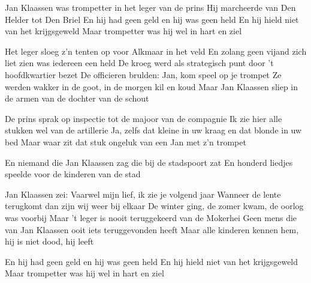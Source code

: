 \begin{chorus}
Jan Klaassen was trompetter in het leger van de prins
Hij marcheerde van Den Helder tot Den Briel
En hij had geen geld en hij was geen held
En hij hield niet van het krijgsgeweld
Maar trompetter was hij wel in hart en ziel
\end{chorus}

\begin{verse*}
Het leger sloeg z'n tenten op voor Alkmaar in het veld
En zolang geen vijand zich liet zien was iedereen een held
De kroeg werd als strategisch punt door 't hoofdkwartier bezet
De officieren brulden: Jan, kom speel op je trompet
Ze werden wakker in de goot, in de morgen kil en koud
Maar Jan Klaassen sliep in de armen van de dochter van de schout
\end{verse*}

\thechorus

\begin{verse*}
De prins sprak op inspectie tot de majoor van de compagnie
Ik zie hier alle stukken wel van de artillerie
Ja, zelfs dat kleine in uw kraag en dat blonde in uw bed
Maar waar zit dat stuk ongeluk van een Jan met z'n trompet
\end{verse*}

\begin{verse*}
En niemand die Jan Klaassen zag die bij de stadspoort zat
En honderd liedjes speelde voor de kinderen van de stad
\end{verse*}

\thechorus

\begin{verse*}
Jan Klaassen zei: Vaarwel mijn lief, ik zie je volgend jaar
Wanneer de lente terugkomt dan zijn wij weer bij elkaar
De winter ging, de zomer kwam, de oorlog was voorbij
Maar 't leger is nooit teruggekeerd van de Mokerhei
Geen mens die van Jan Klaassen ooit iets teruggevonden heeft
Maar alle kinderen kennen hem, hij is niet dood, hij leeft
\end{verse*}

\thechorus

\begin{verse*}
En hij had geen geld en hij was geen held
En hij hield niet van het krijgsgeweld
Maar trompetter was hij wel in hart en ziel
\end{verse*}
